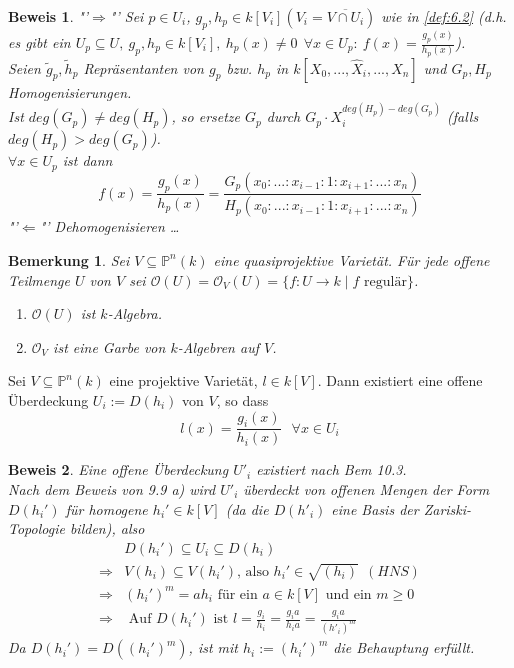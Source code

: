 \documentclass[a4paper,12pt]{report}
\theoremstyle{break}
\newtheorem{Bem}[Def]{Bemerkung}
\theoremstyle{nonumberbreak}
\theoremstyle{nonumberplain}
\newtheorem{Bew}{Beweis}
\begin{document}
\begin{Bew} "'$\Rightarrow$"' Sei $p\in U_i$, $g_p,h_p\in k[V_i](V_i=\overline{V\cap U_i})$ wie in \ref{def:6.2} (d.h. es gibt ein $U_p\subseteq U,~g_p,h_p\in k[V_i],~h_p(x)\neq 0 ~~\forall x\in U_p: ~f(x)=\frac{g_p(x)}{h_p(x)}$).\\
Seien $\tilde{g}_p, \tilde{h}_p$ Repräsentanten von $g_p$ bzw. $h_p$ in $k[X_0,...,\hat{X}_i,...,X_n]$ und $G_p, H_p$ Homogenisierungen.\\
Ist $deg(G_p)\neq deg(H_p)$, so ersetze $G_p$ durch $G_p\cdot X_i^{deg(H_p)-deg(G_p)}$ (falls $deg(H_p)>deg(G_p)$).\\
$\forall x\in U_p$ ist dann $$f(x)=\frac{g_p(x)}{h_p(x)}=\frac{G_p(x_0:...:x_{i-1}:1:x_{i+1}:...:x_n)}{H_p(x_0:...:x_{i-1}:1:x_{i+1}:...:x_n)}$$
"'$\Leftarrow$"' Dehomogenisieren \dots
\end{Bew}
\begin{Bem}
Sei $V\subseteq\mathbb{P}^n(k)$ eine quasiprojektive Varietät. Für jede offene Teilmenge $U$ von $V$ sei $\mathcal{O}(U)=\mathcal{O}_V(U)=\{f: U\rightarrow k \mid f \text{ regulär} \}$.
\begin{enumerate}
\item $\mathcal{O}(U)$ ist $k$-Algebra.\\
\item $\mathcal{O}_V$ ist eine Garbe von $k$-Algebren auf $V$.
\end{enumerate}
\end{Bem}

\begin{Lemma}
Sei $V\subseteq\mathbb{P}^n(k)$ eine projektive Varietät, $l\in k[V]$. Dann existiert eine offene Überdeckung $U_i:=D(h_i)$ von $V$, so dass
$$l(x)=\frac{g_i(x)}{h_i(x)}~~~\forall x\in U_i$$
\end{Lemma}

\begin{Bew}
Eine offene Überdeckung $U'_i$ existiert nach Bem 10.3.\\
Nach dem Beweis von 9.9 a) wird $U'_i$ überdeckt von offenen Mengen der Form $D(h_i')$ für homogene $h_i'\in k[V]$ (da die $D(h'_i)$ eine Basis der Zariski-Topologie bilden), also
\begin{align*}
&D(h_i')\subseteq U_i\subseteq D(h_i)\\
\Rightarrow & V(h_i)\subseteq V(h_i')  \text{, also } h_i'\in\sqrt{(h_i)} ~~ (HNS)\\
\Rightarrow & (h_i')^m=ah_i  \text{ für ein } a\in k[V] \text{ und ein } m\geq 0\\
\Rightarrow & \text{ Auf } D(h_i') \text{ ist } l=\frac{g_i}{h_i}=\frac{g_ia}{h_ia}=\frac{g_ia}{(h'_i)^m}
\end{align*}
Da $D(h_i')=D((h_i')^m)$, ist mit $h_i:=(h_i')^m$ die Behauptung erfüllt.
\end{Bew}
\end{document}
